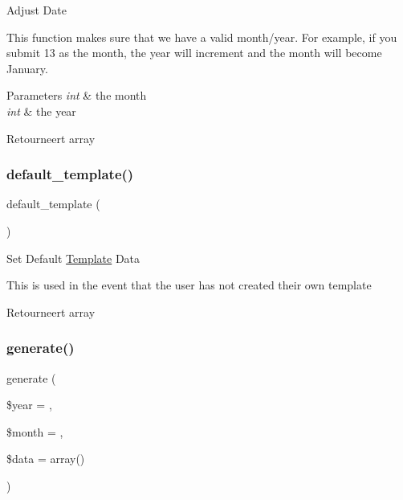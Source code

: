 Adjust Date

This function makes sure that we have a valid month/year. For example, if you submit 13 as the month, the year will increment and the month will become January.


\begin{DoxyParams}{Parameters}
{\em int} & the month \\
\hline
{\em int} & the year \\
\hline
\end{DoxyParams}
\begin{DoxyReturn}{Retourneert}
array 
\end{DoxyReturn}
\mbox{\label{class_c_i___calendar_a5d174710ed7a2a08df21dbaa2bb6a50f}} 
\subsubsection{\texorpdfstring{default\_template()}{default\_template()}}
{\footnotesize\ttfamily default\+\_\+template (\begin{DoxyParamCaption}{ }\end{DoxyParamCaption})}

Set Default \mbox{\hyperlink{class_template}{Template}} Data

This is used in the event that the user has not created their own template

\begin{DoxyReturn}{Retourneert}
array 
\end{DoxyReturn}
\mbox{\label{class_c_i___calendar_aabfc9d516a481b11230cd6562f6809f2}} 
\subsubsection{\texorpdfstring{generate()}{generate()}}
{\footnotesize\ttfamily generate (\begin{DoxyParamCaption}\item[{}]{\$year = {\ttfamily \textquotesingle{}\textquotesingle{}},  }\item[{}]{\$month = {\ttfamily \textquotesingle{}\textquotesingle{}},  }\item[{}]{\$data = {\ttfamily array()} }\end{DoxyParamCaption})}

